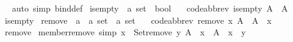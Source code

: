 \begin{isabellebody}
%
\isadelimproof
\ \ %
\endisadelimproof
%
\isatagproof
{}\isamarkupfalse%
\ {\isacharparenleft}{\kern0pt}auto\ simp{\isacharcolon}{\kern0pt}\ bind{\isacharunderscore}{\kern0pt}def{\isacharparenright}{\kern0pt}%
\endisatagproof
{\isafoldproof}%
%
\isadelimproof
%
\endisadelimproof
%
\isadelimdocument
%
\endisadelimdocument
%
\isatagdocument
%
\isamarkuptrue%
%
\endisatagdocument
{\isafolddocument}%
%
\isadelimdocument
%
\endisadelimdocument
{}\isamarkupfalse%
\ is{\isacharunderscore}{\kern0pt}empty\ {\isacharcolon}{\kern0pt}{\isacharcolon}{\kern0pt}\ {\isachardoublequoteopen}{\isacharprime}{\kern0pt}a\ set\ {\isasymRightarrow}\ bool{\isachardoublequoteclose}\isanewline
\ \ \ {\isacharbrackleft}{\kern0pt}code{\isacharunderscore}{\kern0pt}abbrev{\isacharbrackright}{\kern0pt}{\isacharcolon}{\kern0pt}\ {\isachardoublequoteopen}is{\isacharunderscore}{\kern0pt}empty\ A\ {\isasymlongleftrightarrow}\ A\ {\isacharequal}{\kern0pt}\ {\isacharbraceleft}{\kern0pt}{\isacharbraceright}{\kern0pt}{\isachardoublequoteclose}\isanewline
\isanewline
{}\isamarkupfalse%
\ {\isacharparenleft}{\kern0pt}\ is{\isacharunderscore}{\kern0pt}empty\isanewline
\isanewline
{}\isamarkupfalse%
\ remove\ {\isacharcolon}{\kern0pt}{\isacharcolon}{\kern0pt}\ {\isachardoublequoteopen}{\isacharprime}{\kern0pt}a\ {\isasymRightarrow}\ {\isacharprime}{\kern0pt}a\ set\ {\isasymRightarrow}\ {\isacharprime}{\kern0pt}a\ set{\isachardoublequoteclose}\isanewline
\ \ \ {\isacharbrackleft}{\kern0pt}code{\isacharunderscore}{\kern0pt}abbrev{\isacharbrackright}{\kern0pt}{\isacharcolon}{\kern0pt}\ {\isachardoublequoteopen}remove\ x\ A\ {\isacharequal}{\kern0pt}\ A\ {\isacharminus}{\kern0pt}\ {\isacharbraceleft}{\kern0pt}x{\isacharbraceright}{\kern0pt}{\isachardoublequoteclose}\isanewline
\isanewline
{}\isamarkupfalse%
\ {\isacharparenleft}{\kern0pt}\ remove\isanewline
\isanewline
{}\isamarkupfalse%
\ member{\isacharunderscore}{\kern0pt}remove\ {\isacharbrackleft}{\kern0pt}simp{\isacharbrackright}{\kern0pt}{\isacharcolon}{\kern0pt}\ {\isachardoublequoteopen}x\ {\isasymin}\ Set{\isachardot}{\kern0pt}remove\ y\ A\ {\isasymlongleftrightarrow}\ x\ {\isasymin}\ A\ {\isasymand}\ x\ {\isasymnoteq}\ y{\isachardoublequoteclose}\isanewline
%
\isadelimproof
\ \ %
\endisadelimproof

\end{isabellebody}
